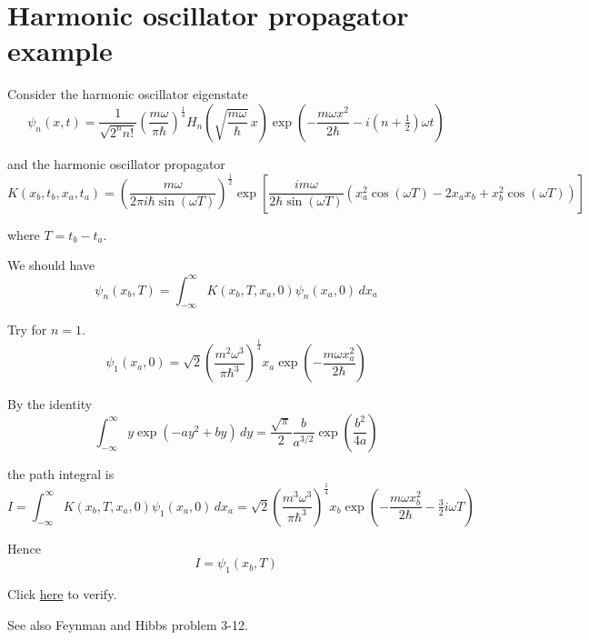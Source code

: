 

\section*{Harmonic oscillator propagator example}

Consider the harmonic oscillator eigenstate
\begin{equation*}
\psi_n(x,t)=\frac{1}{\sqrt{2^nn!}}\left(\frac{m\omega}{\pi\hbar}\right)^\frac{1}{4}
H_n\left(\sqrt{\frac{m\omega}{\hbar}}\,x\right)
\exp\left(-\frac{m\omega x^2}{2\hbar}-i\left(n+\tfrac{1}{2}\right)\omega t\right)
\end{equation*}

and the harmonic oscillator propagator
\begin{equation*}
K(x_b,t_b,x_a,t_a)
=\left(\frac{m\omega}{2\pi i\hbar\sin(\omega T)}\right)^\frac{1}{2}
\exp\left[
\frac{im\omega}{2\hbar\sin(\omega T)}
\left(x_a^2\cos(\omega T)-2x_ax_b+x_b^2\cos(\omega T)\right)
\right]
\end{equation*}

where $T=t_b-t_a$.

\bigskip
We should have
\begin{equation*}
\psi_n(x_b,T)=\int_{-\infty}^\infty K(x_b,T,x_a,0)\psi_n(x_a,0)\,dx_a
\end{equation*}

Try for $n=1$.
\begin{equation*}
\psi_1(x_a,0)=\sqrt2\left(\frac{m^2\omega^3}{\pi\hbar^3}\right)^\frac{1}{4}
x_a\exp\left(-\frac{m\omega x_a^2}{2\hbar}\right)
\end{equation*}

By the identity
\begin{equation*}
\int_{-\infty}^\infty y\exp\left(-ay^2+by\right)\,dy
=\frac{\sqrt\pi}{2}\frac{b}{a^{3/2}}\exp\left(\frac{b^2}{4a}\right)
\end{equation*}

the path integral is
\begin{equation*}
I=\int_{-\infty}^\infty K(x_b,T,x_a,0)\psi_1(x_a,0)\,dx_a
=\sqrt2\left(\frac{m^3\omega^3}{\pi\hbar^3}\right)^\frac{1}{4}
x_b\exp\left(-\frac{m\omega x_b^2}{2\hbar}-\tfrac{3}{2}i\omega T\right)
\end{equation*}

Hence
\begin{equation*}
I=\psi_1(x_b,T)
\end{equation*}

Click \href{https://georgeweigt.github.io/blog/110.html}{here} to verify.

\bigskip
See also Feynman and Hibbs problem 3-12.


